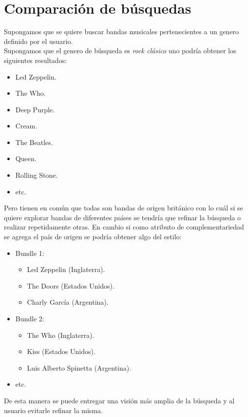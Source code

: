 \section{Comparación de búsquedas}
Supongamos que se quiere buscar bandas musicales pertenecientes a un genero definido por el 
usuario.\\
Supongamos que el genero de búsqueda es \textit{rock clásico} uno podría obtener los siguientes 
resultados:
\begin{itemize}
  \item Led Zeppelin.
  \item The Who.
  \item Deep Purple.
  \item Cream.
  \item The Beatles.
  \item Queen.
  \item Rolling Stone.
  \item etc.
\end{itemize}
Pero tienen en común que todas son bandas de origen británico con lo cuál si se quiere explorar 
bandas de diferentes países se tendría que refinar la búsqueda o realizar repetidamente otras. En 
cambio si como atributo de complementariedad se agrega el país de origen se podría obtener algo del 
estilo:
\begin{itemize}
  \item Bundle 1:
  \begin{itemize}
    \item Led Zeppelin (Inglaterra).
    \item The Doors (Estados Unidos).
    \item Charly García (Argentina).
  \end{itemize}
  \item Bundle 2:
  \begin{itemize}
    \item The Who (Inglaterra).
    \item Kiss (Estados Unidos).
    \item Luis Alberto Spinetta (Argentina).
  \end{itemize}
  \item etc.
\end{itemize}
De esta manera se puede entregar una visión más amplia de la búsqueda y al usuario evitarle refinar 
la misma.
